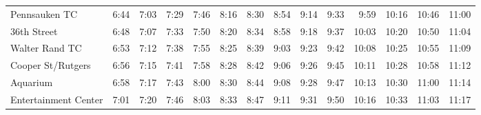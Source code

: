\begin{center}
\begin{tabular}{@{}lrrrrrrrrrrrrr@{}}
Pennsauken TC & 6:44 & 7:03 & 7:29 & 7:46 & 8:16 & 8:30 & 8:54 & 9:14 & 9:33 & 9:59 & 10:16 & 10:46 & 11:00 \\
36th Street & 6:48 & 7:07 & 7:33 & 7:50 & 8:20 & 8:34 & 8:58 & 9:18 & 9:37 & 10:03 & 10:20 & 10:50 & 11:04 \\
Walter Rand TC & 6:53 & 7:12 & 7:38 & 7:55 & 8:25 & 8:39 & 9:03 & 9:23 & 9:42 & 10:08 & 10:25 & 10:55 & 11:09 \\
Cooper St/Rutgers & 6:56 & 7:15 & 7:41 & 7:58 & 8:28 & 8:42 & 9:06 & 9:26 & 9:45 & 10:11 & 10:28 & 10:58 & 11:12 \\
Aquarium & 6:58 & 7:17 & 7:43 & 8:00 & 8:30 & 8:44 & 9:08 & 9:28 & 9:47 & 10:13 & 10:30 & 11:00 & 11:14 \\
Entertainment Center & 7:01 & 7:20 & 7:46 & 8:03 & 8:33 & 8:47 & 9:11 & 9:31 & 9:50 & 10:16 & 10:33 & 11:03 & 11:17 \\
\bottomrule\end{tabular}\end{center}
